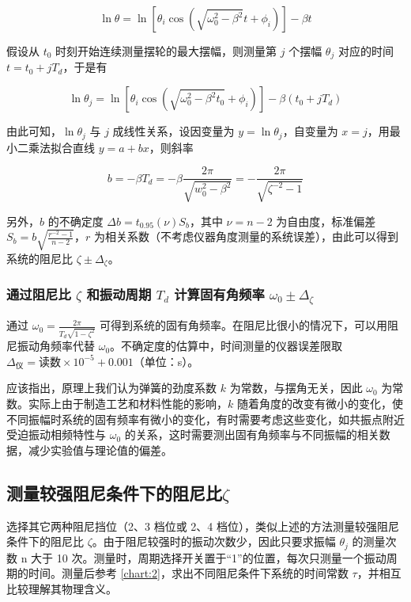 \documentclass[12pt,a4paper]{amsart}
\begin{document}
\begin{equation}
	\ln\theta = \ln[\theta_i\cos(\sqrt{\omega_0^2-\beta^2}t+\phi_i)] - \beta t \label{eq:14}
\end{equation}

假设从 $t_0$ 时刻开始连续测量摆轮的最大摆幅，则测量第 $j$ 个摆幅 $\theta_j$ 对应的时间 $t=t_0+jT_d$，于是有

\begin{equation}
	\ln\theta_j = \ln[\theta_i\cos(\sqrt{\omega_0^2-\beta^2 t_0}+\phi_i)] - \beta(t_0+jT_d) \label{eq:15}
\end{equation}

由此可知，$\ln\theta_j$ 与 $j$ 成线性关系，设因变量为 $y=\ln\theta_j$，自变量为 $x=j$，用最小二乘法拟合直线 $y=a+bx$，则斜率

\begin{equation}
	b = -\beta T_d = -\beta\frac{2\pi}{\sqrt{w_0^2-\beta^2}} = -\frac{2\pi}{\sqrt{\zeta^{-2}-1}} \label{eq:16}
\end{equation}

另外，$b$ 的不确定度 $\Delta b = t_{0.95}(\nu)S_b$，其中 $\nu=n-2$ 为自由度，标准偏差 $S_b = b\sqrt{\frac{r^{-2}-1}{n-2}}$，$r$ 为相关系数（不考虑仪器角度测量的系统误差），由此可以得到系统的阻尼比 $\zeta \pm \Delta_\zeta$。

\subsubsection{通过阻尼比 $\zeta$ 和振动周期 $T_d$ 计算固有角频率 $\omega_0\pm\Delta_\zeta$}

通过 $\omega_0 = \frac{2\pi}{T_d\sqrt{1-\zeta^2}}$ 可得到系统的固有角频率。在阻尼比很小的情况下，可以用阻尼振动角频率代替 $\omega_0$。不确定度的估算中，时间测量的仪器误差限取 $\Delta_\text{仪} = \text{读数} \times 10^{-5} + 0.001$（单位：s）。

应该指出，原理上我们认为弹簧的劲度系数 $k$ 为常数，与摆角无关，因此 $\omega_0$ 为常数。实际上由于制造工艺和材料性能的影响，$k$ 随着角度的改变有微小的变化，使不同振幅时系统的固有频率有微小的变化，有时需要考虑这些变化，如共振点附近受迫振动相频特性与 $\omega_0$ 的关系，这时需要测出固有角频率与不同振幅的相关数据，减少实验值与理论值的偏差。

\subsection{测量较强阻尼条件下的阻尼比$\zeta$}

选择其它两种阻尼挡位（2、3 档位或 2、4 档位），类似上述的方法测量较强阻尼条件下的阻尼比 $\zeta$。由于阻尼较强时的振动次数少，因此只要求振幅 $\theta_j$ 的测量次数 n 大于 10 次。测量时，周期选择开关置于“1”的位置，每次只测量一个振动周期的时间。测量后参考 \ref{chart:2}，求出不同阻尼条件下系统的时间常数 $\tau$，并相互比较理解其物理含义。
\end{document}
